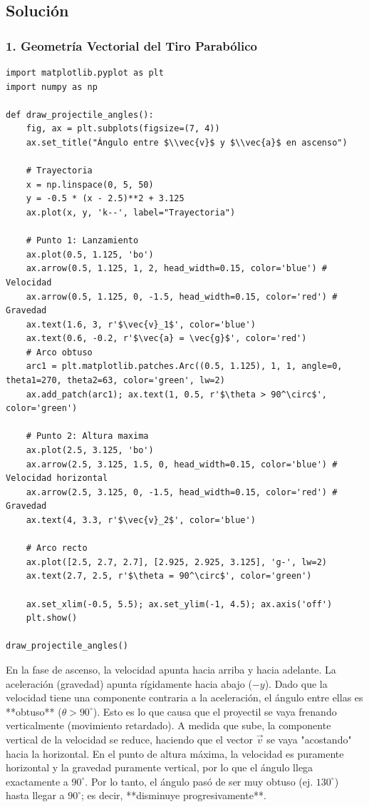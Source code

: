 \documentclass[12pt, a4paper]{article}
\begin{document}
\subsection*{Solución}

\subsubsection*{1. Geometría Vectorial del Tiro Parabólico}

\begin{lstlisting}
import matplotlib.pyplot as plt
import numpy as np

def draw_projectile_angles():
    fig, ax = plt.subplots(figsize=(7, 4))
    ax.set_title("Ángulo entre $\\vec{v}$ y $\\vec{a}$ en ascenso")
    
    # Trayectoria
    x = np.linspace(0, 5, 50)
    y = -0.5 * (x - 2.5)**2 + 3.125
    ax.plot(x, y, 'k--', label="Trayectoria")
    
    # Punto 1: Lanzamiento
    ax.plot(0.5, 1.125, 'bo')
    ax.arrow(0.5, 1.125, 1, 2, head_width=0.15, color='blue') # Velocidad
    ax.arrow(0.5, 1.125, 0, -1.5, head_width=0.15, color='red') # Gravedad
    ax.text(1.6, 3, r'$\vec{v}_1$', color='blue')
    ax.text(0.6, -0.2, r'$\vec{a} = \vec{g}$', color='red')
    # Arco obtuso
    arc1 = plt.matplotlib.patches.Arc((0.5, 1.125), 1, 1, angle=0, theta1=270, theta2=63, color='green', lw=2)
    ax.add_patch(arc1); ax.text(1, 0.5, r'$\theta > 90^\circ$', color='green')

    # Punto 2: Altura maxima
    ax.plot(2.5, 3.125, 'bo')
    ax.arrow(2.5, 3.125, 1.5, 0, head_width=0.15, color='blue') # Velocidad horizontal
    ax.arrow(2.5, 3.125, 0, -1.5, head_width=0.15, color='red') # Gravedad
    ax.text(4, 3.3, r'$\vec{v}_2$', color='blue')
    
    # Arco recto
    ax.plot([2.5, 2.7, 2.7], [2.925, 2.925, 3.125], 'g-', lw=2)
    ax.text(2.7, 2.5, r'$\theta = 90^\circ$', color='green')

    ax.set_xlim(-0.5, 5.5); ax.set_ylim(-1, 4.5); ax.axis('off')
    plt.show()

draw_projectile_angles()
\end{lstlisting}

En la fase de ascenso, la velocidad apunta hacia arriba y hacia adelante. La aceleración (gravedad) apunta rígidamente hacia abajo ($-y$).
Dado que la velocidad tiene una componente contraria a la aceleración, el ángulo entre ellas es **obtuso** ($\theta > 90^\circ$). Esto es lo que causa que el proyectil se vaya frenando verticalmente (movimiento retardado).
A medida que sube, la componente vertical de la velocidad se reduce, haciendo que el vector $\vec{v}$ se vaya "acostando" hacia la horizontal. 
En el punto de altura máxima, la velocidad es puramente horizontal y la gravedad puramente vertical, por lo que el ángulo llega exactamente a $90^\circ$. 
Por lo tanto, el ángulo pasó de ser muy obtuso (ej. $130^\circ$) hasta llegar a $90^\circ$; es decir, **disminuye progresivamente**.
\end{document}
